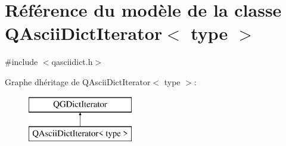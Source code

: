 \hypertarget{class_q_ascii_dict_iterator}{}\section{Référence du modèle de la classe Q\+Ascii\+Dict\+Iterator$<$ type $>$}
\label{class_q_ascii_dict_iterator}


{\ttfamily \#include $<$qasciidict.\+h$>$}

Graphe d\textquotesingle{}héritage de Q\+Ascii\+Dict\+Iterator$<$ type $>$\+:\begin{figure}[H]
\begin{center}
\leavevmode
\includegraphics[height=2.000000cm]{class_q_ascii_dict_iterator}
\end{center}
\end{figure}
